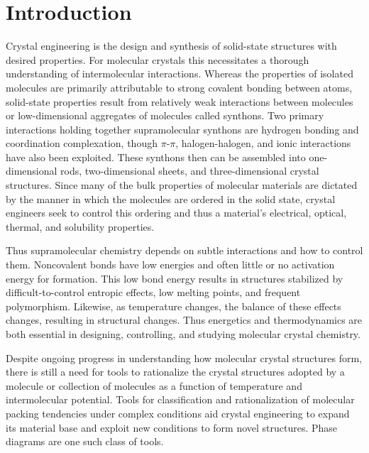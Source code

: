 \documentclass[preprint]{iucr}              %
\begin{document}
\pagebreak

\section{Introduction}

Crystal engineering is the design and synthesis of solid-state structures with
desired properties.  For molecular crystals this necessitates a thorough
understanding of intermolecular interactions.  Whereas the properties of
isolated molecules are primarily attributable to strong covalent bonding
between atoms, solid-state properties result from relatively weak interactions
between molecules or low-dimensional aggregates of molecules called synthons. 
Two primary interactions holding together supramolecular synthons are hydrogen
bonding and coordination complexation, though $\pi$-$\pi$, halogen-halogen, and
ionic interactions have also been exploited\cite{Thalladi96}. These synthons
then can be assembled into one-dimensional rods, two-dimensional sheets, and
three-dimensional crystal structures. Since many of the bulk properties of
molecular materials are dictated by the manner in which the molecules are
ordered in the solid state, crystal engineers seek to control this ordering and
thus a material's electrical, optical, thermal, and solubility
properties\cite{Desiraju89,Braga99,Bassoul00,Lommerse00,Holman01b,Moulton01}.

Thus supramolecular chemistry depends on subtle interactions and how to control
them.  Noncovalent bonds have low energies and often little or no activation
energy for formation. This low bond energy results in structures stabilized by
difficult-to-control entropic effects, low melting points, and frequent
polymorphism. Likewise, as temperature changes, the balance of these effects
changes, resulting in structural changes\cite{Neumann03}.  Thus energetics and
thermodynamics are both essential in designing, controlling, and studying
molecular crystal chemistry. 

Despite ongoing progress in understanding how molecular crystal structures form,
there is still a need for tools to rationalize the crystal structures adopted by
a molecule or collection of molecules as a function of temperature and
intermolecular potential.  Tools for classification and rationalization of
molecular packing tendencies under complex conditions aid crystal engineering to
expand its material base and exploit new conditions to form novel structures. 
Phase diagrams are one such class of tools.
\end{document}
